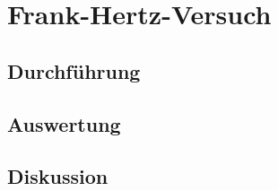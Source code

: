 \chapter{Frank-Hertz-Versuch}

\section{Durchführung}

\section{Auswertung}

\section{Diskussion}

\printbibliography



